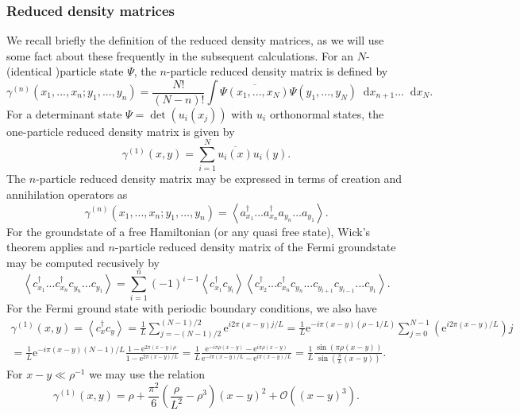 \documentclass[a4paper,11pt]{article}
\newcommand{\euler}[1]{\text{e}^{#1}}
\renewcommand{\braket}[1]{\left\langle#1\right\rangle}
\newcommand*\diff{\mathop{}\!\mathrm{d}}
\numberwithin{equation}{section}
\begin{document}
	\subsubsection{Reduced density matrices}
	We recall briefly the definition of the reduced density matrices, as we will use some fact about these frequently in the subsequent calculations.
	For an $ N $-(identical )particle state $ \Psi $, the $ n $-particle reduced density matrix is defined by \begin{equation}
	\gamma^{(n)}(x_1,...,x_n;y_1,...,y_n)=\frac{N!}{(N-n)!}\int \overline{\Psi(x_1,...,x_N)}\Psi(y_1,...,y_N)\diff x_{n+1}...\diff x_N.
	\end{equation}
	For a determinant state $ \Psi=\det\left(u_i(x_j)\right) $ with $ u_i $ orthonormal states, the one-particle reduced density matrix is given by \begin{equation}
	\gamma^{(1)}(x,y)=\sum_{i=1}^{N} \overline{u_i(x)}u_i(y).
	\end{equation} 
	The $ n $-particle reduced density matrix may be expressed in terms of creation and annihilation operators as \begin{equation}
	\gamma^{(n)}(x_1,...,x_n;y_1,...,y_n)=\braket{a^\dagger_{x_1}...a^\dagger_{x_n}a_{y_n}...a_{y_1}}.
	\end{equation}
	For the groundstate of a free Hamiltonian (or any quasi free state), Wick's theorem applies and $ n $-particle reduced density matrix of the Fermi groundstate may be computed recusively by \begin{equation}
	\braket{c^\dagger_{x_1}...c^\dagger_{x_n}c_{y_n}...c_{y_1}}=\sum_{i=1}^{n}(-1)^{i-1}\braket{c^\dagger_{x_1}c_{y_i}}\braket{c^\dagger_{x_2}...c^\dagger_{x_n}c_{y_n}...c_{y_{i+1}}c_{y_{i-1}}...c_{y_1}}.
	\end{equation}
	For the Fermi ground state with periodic boundary conditions, we also have \begin{equation}
	\begin{aligned}
	\gamma^{(1)}(x,y)=\braket{c^\dagger_{x}c_{y}}=\frac{1}{L}\sum_{j=-(N-1)/2}^{(N-1)/2}\euler{i2\pi(x-y)j/L}=\frac{1}{L}\euler{-i\pi(x-y)(\rho-1/L)}\sum_{j=0}^{N-1}\left(\euler{i2\pi(x-y)/L}\right){j}\\=\frac{1}{L}\euler{-i\pi(x-y)(N-1)/L}\frac{1-\euler{2\pi(x-y)\rho}}{1-\euler{2\pi(x-y)/L}}=\frac{1}{L}\frac{\euler{-i\pi\rho(x-y)}-\euler{i\pi\rho(x-y)}}{\euler{-i\pi(x-y)/L}-\euler{i\pi(x-y)/L}}=\frac{1}{L}\frac{\sin(\pi\rho(x-y))}{\sin\left(\frac{\pi}{L}(x-y)\right)}.
	\end{aligned}
	\end{equation}
	For $ x-y\ll\rho^{-1} $ we may use the relation \begin{equation}
	\gamma^{(1)}(x,y)=\rho+\frac{\pi^2}{6}\left(\frac{\rho}{L^2}-\rho^3\right)(x-y)^2+\mathcal{O}((x-y)^3).
	\end{equation}
\end{document}

